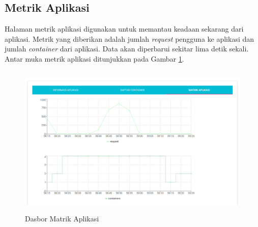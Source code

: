          \subsection{Metrik Aplikasi}
         	Halaman metrik aplikasi digunakan untuk memantau keadaan sekarang dari aplikasi. Metrik yang diberikan adalah jumlah \textit{request} pengguna ke aplikasi dan jumlah \textit{container} dari aplikasi. Data akan diperbarui sekitar lima detik sekali. Antar muka metrik aplikasi ditunjukkan pada Gambar \ref{dmatrikaplikasi}.
            \begin{figure}[H]
				\centering
				\includegraphics[width=11.2cm,height=7.3cm]{Images/C-4/dasmatrik.PNG}
				\caption{Dasbor Matrik Aplikasi}
				\label{dmatrikaplikasi}
			\end{figure}
